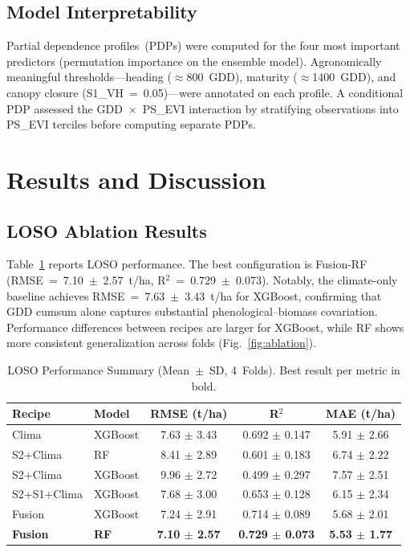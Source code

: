 \documentclass[lettersize,journal]{IEEEtran}
\begin{document}
\subsection{Model Interpretability}

Partial dependence profiles~(PDPs) were computed for the four most important
predictors (permutation importance on the ensemble model). Agronomically
meaningful thresholds---heading ($\approx$800~GDD), maturity
($\approx$1400~GDD), and canopy closure (S1\_VH~=~0.05)---were annotated on
each profile. A conditional PDP assessed the GDD~$\times$~PS\_EVI interaction
by stratifying observations into PS\_EVI terciles before computing separate
PDPs.

\section{Results and Discussion}

\subsection{LOSO Ablation Results}

Table~\ref{tab:results} reports LOSO performance. The best configuration is
Fusion-RF (RMSE~=~7.10~$\pm$~2.57~t/ha, R$^2$~=~0.729~$\pm$~0.073).
Notably, the climate-only baseline achieves RMSE~=~7.63~$\pm$~3.43~t/ha
for XGBoost, confirming that GDD cumsum alone captures substantial
phenological--biomass covariation. Performance differences between recipes
are larger for XGBoost, while RF shows more consistent generalization across
folds (Fig.~\ref{fig:ablation}).

\begin{table}[!t]
\caption{LOSO Performance Summary (Mean~$\pm$~SD, 4~Folds).
Best result per metric in bold.\label{tab:results}}
\centering
\footnotesize
\begin{tabular}{llccc}
\toprule
\textbf{Recipe} & \textbf{Model} &
  \textbf{RMSE (t/ha)} & \textbf{R$^2$} & \textbf{MAE (t/ha)} \\
\midrule
Clima        & XGBoost & 7.63 $\pm$ 3.43 & 0.692 $\pm$ 0.147 & 5.91 $\pm$ 2.66 \\
S2+Clima     & RF      & 8.41 $\pm$ 2.89 & 0.601 $\pm$ 0.183 & 6.74 $\pm$ 2.22 \\
S2+Clima     & XGBoost & 9.96 $\pm$ 2.72 & 0.499 $\pm$ 0.297 & 7.57 $\pm$ 2.51 \\
S2+S1+Clima  & XGBoost & 7.68 $\pm$ 3.00 & 0.653 $\pm$ 0.128 & 6.15 $\pm$ 2.34 \\
Fusion       & XGBoost & 7.24 $\pm$ 2.91 & 0.714 $\pm$ 0.089 & 5.68 $\pm$ 2.01 \\
\textbf{Fusion} & \textbf{RF} &
  \textbf{7.10 $\pm$ 2.57} & \textbf{0.729 $\pm$ 0.073} &
  \textbf{5.53 $\pm$ 1.77} \\
\bottomrule
\end{tabular}
\end{table}
\end{document}
